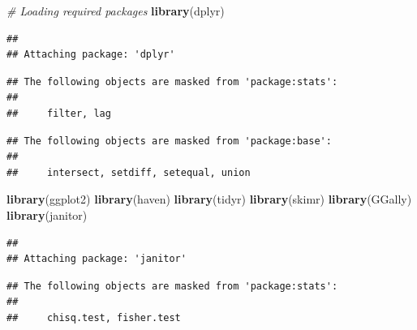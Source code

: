 \documentclass[
]{article}
\newenvironment{Shaded}{\begin{snugshade}}{\end{snugshade}}
\newcommand{\CommentTok}[1]{\textcolor[rgb]{0.56,0.35,0.01}{\textit{#1}}}
\newcommand{\FunctionTok}[1]{\textcolor[rgb]{0.13,0.29,0.53}{\textbf{#1}}}
\newcommand{\NormalTok}[1]{#1}
\begin{document}
\begin{Shaded}
\begin{Highlighting}[]
\CommentTok{\# Loading required packages}
\FunctionTok{library}\NormalTok{(dplyr)}
\end{Highlighting}
\end{Shaded}

\begin{verbatim}
## 
## Attaching package: 'dplyr'
\end{verbatim}

\begin{verbatim}
## The following objects are masked from 'package:stats':
## 
##     filter, lag
\end{verbatim}

\begin{verbatim}
## The following objects are masked from 'package:base':
## 
##     intersect, setdiff, setequal, union
\end{verbatim}

\begin{Shaded}
\begin{Highlighting}[]
\FunctionTok{library}\NormalTok{(ggplot2)}
\FunctionTok{library}\NormalTok{(haven)}
\FunctionTok{library}\NormalTok{(tidyr)}
\FunctionTok{library}\NormalTok{(skimr)}
\FunctionTok{library}\NormalTok{(GGally)}
\FunctionTok{library}\NormalTok{(janitor)}
\end{Highlighting}
\end{Shaded}

\begin{verbatim}
## 
## Attaching package: 'janitor'
\end{verbatim}

\begin{verbatim}
## The following objects are masked from 'package:stats':
## 
##     chisq.test, fisher.test
\end{verbatim}
\end{document}

